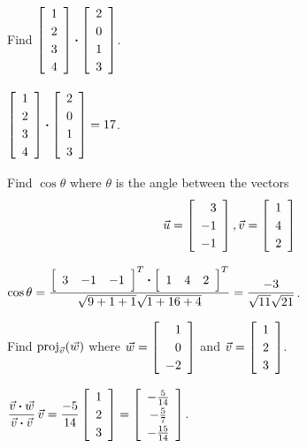 \documentclass{ximera}
\author{Zack Reed}
\begin{document}
\begin{example}
    Find $\startmat{r}
      1 \\
      2 \\
      3 \\
      4
    \stopmat \dotprod \startmat{r}
      2 \\
      0 \\
      1 \\
      3
    \stopmat$.
    \begin{solution}
      $\startmat{r}
        1 \\
        2 \\
        3 \\
        4
      \stopmat \dotprod \startmat{r}
        2 \\
        0 \\
        1 \\
        3
      \stopmat = 17$.
    \end{solution}
  \end{example}
  

  
  \begin{example}
    Find $\cos \theta$ where $\theta$ is the angle between the vectors
    \begin{equation*}
      \vect{u}
      =
      \startmat{r}
        3 \\
        -1 \\
        -1
      \stopmat,
      \vect{v}
      =
      \startmat{r}
        1 \\
        4 \\
        2
      \stopmat
    \end{equation*}
    \begin{solution}
      $\displaystyle\cos\theta=\frac{\startmat{ccc}
          3 & -1 & -1
        \stopmat^T \dotprod
        \startmat{ccc}
          1 & 4 & 2
        \stopmat^T}
      {\sqrt{9+1+1}\sqrt{1+16+4}}= \frac{-3}{\sqrt{11}\sqrt{21}}$.
    \end{solution}
  \end{example}
  
  \begin{example}
    Find $\text{proj}_{\vec{v}}(\vec{w})$ where
    $\vect{w}=\startmat{r}
      1 \\
      0 \\
      -2
    \stopmat$ and $\vect{v}=\startmat{r}
      1 \\
      2 \\
      3
    \stopmat$.
    \begin{solution}
      $\displaystyle
      \def\arraystretch{1.2}
      \frac{\vect{v}\dotprod \vect{w}}{\vect{v}\dotprod
        \vect{v}}\,\vect{v}=\frac{-5}{14}\startmat{r}
        1 \\
        2 \\
        3
      \stopmat =\startmat{c}
        -\frac{5}{14} \\
        -\frac{5}{7} \\
        -\frac{15}{14}
      \stopmat$.
    \end{solution}
  \end{example}
  
\end{document}
